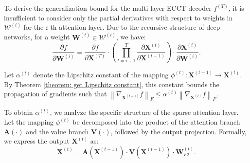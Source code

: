 \documentclass[lettersize,onecolumn]{IEEEtran}
\begin{document}
To derive the generalization bound for the multi-layer ECCT decoder $f^{(T)}$, it is insufficient to consider only the partial derivatives with respect to weights in $\mathcal{W}^{(i)}$ for the $i$-th attention layer. Due to the recursive structure of deep networks, for a weight $\mathbf{W}^{(i)} \in \mathcal{W}^{(i)}$, we have:
\begin{equation}
    \frac{\partial f}{\partial \mathbf{W}^{(i)}}=\frac{\partial f}{\partial \mathbf{X}^{(T)}} \cdot\left(\prod_{t=i+1}^{T} \frac{\partial \mathbf{X}^{(t)}}{\partial \mathbf{X}^{(t-1)}}\right) \cdot \frac{\partial \mathbf{X}^{(i)}}{\partial \mathbf{W}^{(i)}}.
\end{equation}

Let $\alpha^{(t)}$ denote the Lipschitz constant of the mapping $\phi^{(t)}: \mathbf{X}^{(t-1)} \rightarrow \mathbf{X}^{(t)}$. By Theorem \ref{theorem: get Lipschitz constant}, this constant bounds the propagation of gradients such that $\left\| \nabla_{\mathbf{X}^{(t-1)}} f \right\|_F \leq \alpha^{(t)} \left\| \nabla_{\mathbf{X}^{(t)}} f \right\|_F$.

To obtain $\alpha^{(t)}$, we analyze the specific structure of the sparse attention layer. Let the mapping $\phi^{(t)}$ be decomposed into the product of the attention branch $\mathbf{A}(\cdot)$ and the value branch $\mathbf{V}(\cdot)$, followed by the output projection. Formally, we express the output $\mathbf{X}^{(t)}$ as:
\begin{equation} 
\mathbf{X}^{(t)} = \mathbf{A}\left(\mathbf{X}^{(t-1)}\right) \cdot \mathbf{V}\left(\mathbf{X}^{(t-1)}\right) \cdot \mathbf{W}_{F 2}^{(t)}. 
\end{equation}
\end{document}
